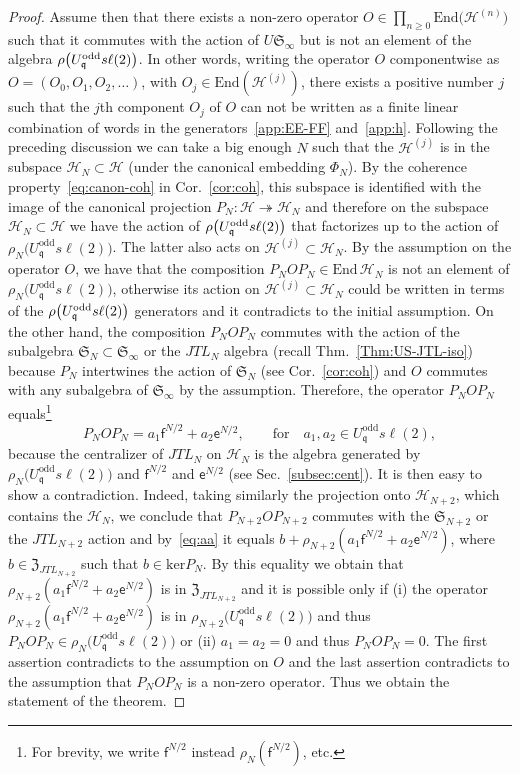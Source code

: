 \documentclass[11pt]{article}
\newcommand{\surj}{\twoheadrightarrow}
\newcommand{\proj}{P}
\newcommand{\q}{\mathfrak{q}}
\newcommand{\JTL}[1]{JTL_{#1}}
\newcommand{\LQGodd}{U^{\text{odd}}_{\q} s\ell(2)}
\newcommand{\f}{\mathsf{f}}
\newcommand{\e}{\mathsf{e}}
\newcommand{\Hilb}{\mathcal{H}}
\newcommand{\Endo}{\mathrm{End}}
\newcommand{\interLie}{\mathfrak{S}}
\newcommand{\interfin}[1]{\interLie_{#1}}
\newcommand{\interinfin}{\interLie_{\infty}}
\newcommand{\cent}{\mathfrak{Z}}
\theoremstyle{definition}
\begin{document}
\begin{proof}
Assume then that there exists a non-zero operator $O\in\prod_{n\geq 0} \Endo\bigl(\Hilb^{(n)}\bigr)$ such that it commutes with the action of $U\interinfin$ but is not an element of the algebra $\rodd$. In other words, writing the operator $O$ componentwise as $O=(O_0,O_1,O_2,\dots)$, with $O_j\in\Endo(\Hilb^{(j)})$, there exists a positive number $j$ such that the $j$th component $O_j$ of $O$ can not be written as a finite linear combination of words in the generators~\eqref{app:EE-FF} and~\eqref{app:h}. Following the preceding discussion we can take a big enough $N$ such that the $\Hilb^{(j)}$ is in the subspace $\Hilb_N\subset\Hilb$ (under the canonical embedding $\Phi_N$).
By the coherence property~\eqref{eq:canon-coh} in Cor.~\ref{cor:coh}, this subspace is identified with the image of the canonical projection $\proj_N:\Hilb\surj\Hilb_N$ and therefore on the subspace $\Hilb_N\subset\Hilb$ we have the action of $\rodd$ that factorizes up to the action of $\rho_N\bigl(\LQGodd\bigr)$. The latter also acts on $\Hilb^{(j)}\subset\Hilb_N$.
 By the assumption on the operator $O$, we have that the composition $\proj_N O \proj_N\in\Endo\, \Hilb_N$ is not an element of $\rho_N\bigl(\LQGodd\bigr)$, otherwise its action on $\Hilb^{(j)}\subset\Hilb_N$ could be written in terms of the $\rodd$ generators and it contradicts to the initial assumption. On the other hand, the composition $\proj_N O \proj_N$ commutes with the action of the subalgebra $\interfin{N}\subset\interinfin$ or the $\JTL{N}$ algebra (recall Thm.~\ref{Thm:US-JTL-iso}) because $P_N$ intertwines the action of $\interfin{N}$ (see Cor.~\ref{cor:coh}) and $O$ commutes with any subalgebra of $\interinfin$ by the assumption. Therefore, the operator $\proj_N O \proj_N$ equals\footnote{For brevity, we write $\f^{N/2}$ instead $\rho_N(\f^{N/2})$, etc.}
 \begin{equation}\label{eq:aa}
 \proj_N O \proj_N = a_1\f^{N/2} + a_2\e^{N/2}, \qquad \text{for}\quad a_1,a_2\in\LQGodd,
  \end{equation}
 because the centralizer of $\JTL{N}$ on $\Hilb_N$ is the algebra generated by $\rho_N\bigl(\LQGodd\bigr)$ and $\f^{N/2}$ and $\e^{N/2}$ (see Sec.~\ref{subsec:cent}). It is then easy to show a contradiction. Indeed, taking similarly the projection onto $\Hilb_{N+2}$, which contains the $\Hilb_N$, we conclude that $P_{N+2}O P_{N+2}$ commutes with the $\interfin{N+2}$ or the $\JTL{N+2}$ action and by~\eqref{eq:aa} it equals $b+\rho_{N+2}(a_1\f^{N/2}+a_2\e^{N/2})$, where $b\in\cent_{\JTL{N+2}}$ such that $b\in\mathrm{ker}P_N$. By this
 equality we obtain that $\rho_{N+2}(a_1\f^{N/2}+a_2\e^{N/2})$ is in $\cent_{\JTL{N+2}}$ and it is possible only if (i) the operator $\rho_{N+2}(a_1\f^{N/2} + a_2\e^{N/2})$ is in $\rho_{N+2}\bigl(\LQGodd\bigr)$ and thus $\proj_N O \proj_N\in\rho_{N}\bigl(\LQGodd\bigr)$ or (ii) $a_1=a_2=0$ and thus $\proj_N O \proj_N=0$. The first assertion contradicts to the assumption on $O$ and the last assertion contradicts to the assumption that $\proj_N O \proj_N$ is a non-zero operator. Thus we obtain the statement of the theorem.
\end{proof}
\end{document}
